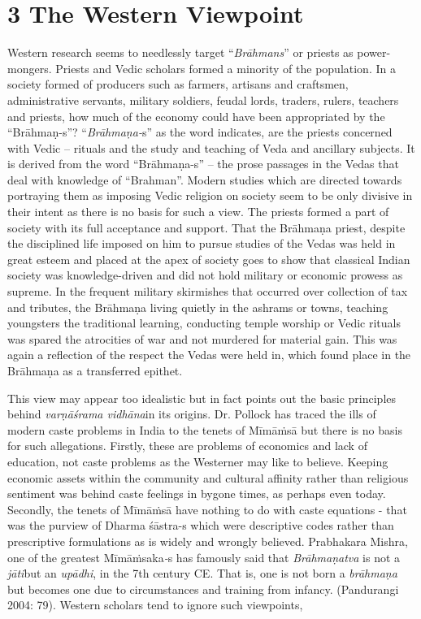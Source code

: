 \section*{3 The Western Viewpoint}

Western research seems to needlessly target “\textit{Brāhmans}” or priests as power-mongers. Priests and Vedic scholars formed a minority of the population. In a society formed of producers such as farmers, artisans and craftsmen, administrative servants, military soldiers, feudal lords, traders, rulers, teachers and priests, how much of the economy could have been appropriated by the “Brāhmaṇ-s”? “\textit{Brāhmaṇa-}s” as the word indicates, are the priests concerned with Vedic – rituals and the study and teaching of Veda and ancillary subjects. It is derived from the word “Brāhmaṇa-s” – the prose passages in the Vedas that deal with knowledge of “Brahman”. Modern studies which are directed towards portraying them as imposing Vedic religion on society seem to be only divisive in their intent as there is no basis for such a view. The priests formed a part of society with its full acceptance and support. That the Brāhmaṇa priest, despite the disciplined life imposed on him to pursue studies of the Vedas was held in great esteem and placed at the apex of society goes to show that classical Indian society was knowledge-driven and did not hold military or economic prowess as supreme. In the frequent military skirmishes that occurred over collection of tax and tributes, the Brāhmaṇa living quietly in the ashrams or towns, teaching youngsters the traditional learning, conducting temple worship or Vedic rituals was spared the atrocities of war and not murdered for material gain. This was again a reflection of the respect the Vedas were held in, which found place in the Brāhmaṇa as a transferred epithet.

This view may appear too idealistic but in fact points out the basic principles behind \textit{varṇāśrama vidhāna}in its origins. Dr. Pollock has traced the ills of modern caste problems in India to the tenets of Mīmāṁsā but there is no basis for such allegations. Firstly, these are problems of economics and lack of education, not caste problems as the Westerner may like to believe. Keeping economic assets within the community and cultural affinity rather than religious sentiment was behind caste feelings in bygone times, as perhaps even today. Secondly, the tenets of Mīmāṁsā have nothing to do with caste equations - that was the purview of Dharma śāstra-s which were descriptive codes rather than prescriptive formulations as is widely and wrongly believed. Prabhakara Mishra, one of the greatest Mīmāṁsaka\textit{-}s has famously said that \textit{Brāhmaṇatva} is not a \textit{jāti}but an \textit{upādhi}, in the 7th century CE. That is, one is not born a \textit{brāhmaṇa} but becomes one due to circumstances and training from infancy. (Pandurangi 2004: 79). Western scholars tend to ignore such viewpoints,

